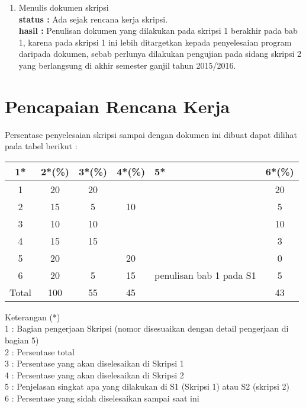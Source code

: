 \documentclass[a4paper,twoside]{article}
\begin{document}
\begin{enumerate}
		\item Menulis dokumen skripsi\\
		{\bf status :} Ada sejak rencana kerja skripsi.\\
		{\bf hasil :} Penulisan dokumen yang dilakukan pada skripsi 1 berakhir pada bab 1, karena pada skripsi 1 ini lebih ditargetkan kepada penyelesaian program daripada dokumen, sebab perlunya dilakukan pengujian pada sidang skripsi 2 yang berlangsung di akhir semester ganjil tahun 2015/2016. 
	
	\end{enumerate}

\section{Pencapaian Rencana Kerja}
Persentase penyelesaian skripsi sampai dengan dokumen ini dibuat dapat dilihat pada tabel berikut :

\begin{center}
  \begin{tabular}{ | c | c | c | c | l | c |}
    \hline
    1*  & 2*(\%) & 3*(\%) & 4*(\%) &5* &6*(\%)\\ \hline \hline
    1   & 20  & 20  &  & & 20 \\ \hline
    2   & 15 & 5  & 10  & & 5 \\ \hline
    3   & 10  & 10  &  &  & 10 \\ \hline
    4   & 15  & 15  &   &  & 3 \\ \hline
    5   & 20 &   & 20 & & 0 \\ \hline
    6   & 20 & 	5 & 15  & {\footnotesize penulisan bab 1 pada S1}  & 5 \\\hline
    Total  & 100  & 55  & 45 &  & 43\\ \hline
                          \end{tabular}
\end{center}

Keterangan (*)\\
1 : Bagian pengerjaan Skripsi (nomor disesuaikan dengan detail pengerjaan di bagian 5)\\
2 : Persentase total \\
3 : Persentase yang akan diselesaikan di Skripsi 1 \\
4 : Persentase yang akan diselesaikan di Skripsi 2 \\
5 : Penjelasan singkat apa yang dilakukan di S1 (Skripsi 1) atau S2 (skripsi 2)\\
6 : Persentase yang sidah diselesaikan sampai saat ini 
\end{document}
